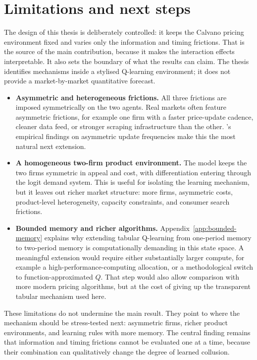 \section{Limitations and next steps}
\label{sec:limitations}

The design of this thesis is deliberately controlled: it keeps the Calvano pricing environment fixed and varies only the information and timing frictions. That is the source of the main contribution, because it makes the interaction effects interpretable. It also sets the boundary of what the results can claim. The thesis identifies mechanisms inside a stylised Q-learning environment; it does not provide a market-by-market quantitative forecast.

\begin{itemize}[topsep=2pt, itemsep=4pt]
    \item \textbf{Asymmetric and heterogeneous frictions.} All three frictions are imposed symmetrically on the two agents. Real markets often feature asymmetric frictions, for example one firm with a faster price-update cadence, cleaner data feed, or stronger scraping infrastructure than the other. \citet{brown2023}'s empirical findings on asymmetric update frequencies make this the most natural next extension.
    \item \textbf{A homogeneous two-firm product environment.} The model keeps the two firms symmetric in appeal and cost, with differentiation entering through the logit demand system. This is useful for isolating the learning mechanism, but it leaves out richer market structure: more firms, asymmetric costs, product-level heterogeneity, capacity constraints, and consumer search frictions.
    \item \textbf{Bounded memory and richer algorithms.} Appendix~\ref{app:bounded-memory} explains why extending tabular Q-learning from one-period memory to two-period memory is computationally demanding in this state space. A meaningful extension would require either substantially larger compute, for example a high-performance-computing allocation, or a methodological switch to function-approximated $Q$. That step would also allow comparison with more modern pricing algorithms, but at the cost of giving up the transparent tabular mechanism used here.
\end{itemize}

These limitations do not undermine the main result. They point to where the mechanism should be stress-tested next: asymmetric firms, richer product environments, and learning rules with more memory. The central finding remains that information and timing frictions cannot be evaluated one at a time, because their combination can qualitatively change the degree of learned collusion.
